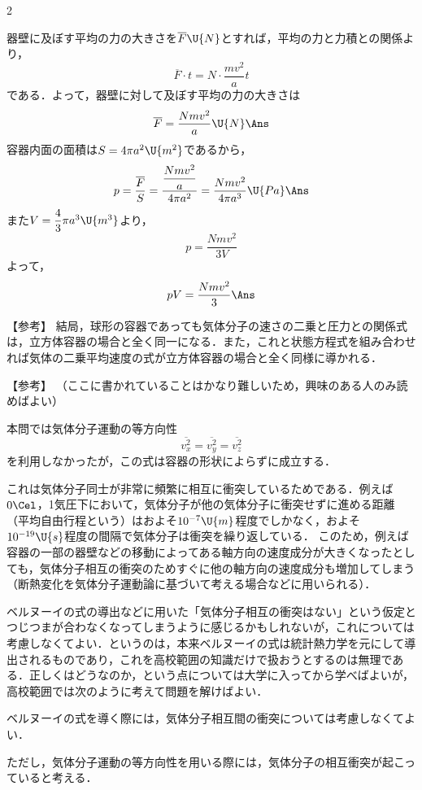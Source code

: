 \begin{multicols}{2}
\begin{komon}
 器壁に及ぼす平均の力の大きさを$\overline{F}\U{N}$とすれば，平均の力と力積との関係より，
       \[\overline{F}\cdot t=N\cdot\frac{mv^2}{a}t\]
       である．よって，器壁に対して及ぼす平均の力の大きさは
       \[\overline{F}=\frac{Nmv^2}{a}\U{N}\Ans\]
 容器内面の面積は$S=4\pi a^2\U{m^2}$であるから，
       \[p=\frac{\overline{F}}{S}=\frac{\dfrac{Nmv^2}{a}}{4\pi a^2}=\frac{Nmv^2}{4\pi a^3}\U{Pa}\Ans\]
 また$V=\dfrac{4}{3}\pi a^3\U{m^3}$より，
       \[p=\frac{Nmv^2}{3V}\]
       よって，
       \[pV=\frac{Nmv^2}{3}\Ans\]
\end{komon}
\begin{itembox}[l]{【参考】}
結局，球形の容器であっても気体分子の速さの二乗と圧力との関係式は，立方体容器の場合と全く同一になる．また，これと状態方程式を組み合わせれば気体の二乗平均速度の式が立方体容器の場合と全く同様に導かれる．
\end{itembox}
\begin{itembox}[l]{【参考】}
（ここに書かれていることはかなり難しいため，興味のある人のみ読めばよい）\par
\hspace*{1zw}本問では気体分子運動の等方向性
\[\overline{v_x^2}=\overline{v_y^2}=\overline{v_z^2}\]
を利用しなかったが，この式は容器の形状によらずに成立する．\par
\hspace*{1zw}これは気体分子同士が非常に頻繁に相互に衝突しているためである．例えば$0\Cel$，1気圧下において，気体分子が他の気体分子に衝突せずに進める距離（平均自由行程という）はおよそ$10^{-7}\U{m}$程度でしかなく，およそ$10^{-19}\U{s}$程度の間隔で気体分子は衝突を繰り返している．
このため，例えば容器の一部の器壁などの移動によってある軸方向の速度成分が大きくなったとしても，気体分子相互の衝突のためすぐに他の軸方向の速度成分も増加してしまう（断熱変化を気体分子運動論に基づいて考える場合などに用いられる）．\par
\hspace*{1zw}ベルヌーイの式の導出などに用いた「気体分子相互の衝突はない」という仮定とつじつまが合わなくなってしまうように感じるかもしれないが，これについては考慮しなくてよい．というのは，本来ベルヌーイの式は統計熱力学を元にして導出されるものであり，これを高校範囲の知識だけで扱おうとするのは無理である．正しくはどうなのか，という点については大学に入ってから学べばよいが，高校範囲では次のように考えて問題を解けばよい．
\begin{komon}
\item[{\makebox[1.9zw][r]{\MARU{1}}}] ベルヌーイの式を導く際には，気体分子相互間の衝突については考慮しなくてよい．
\item[{\makebox[1.9zw][r]{\MARU{2}}}] ただし，気体分子運動の等方向性を用いる際には，気体分子の相互衝突が起こっていると考える．
\end{komon}
\end{itembox}

\end{multicols}
